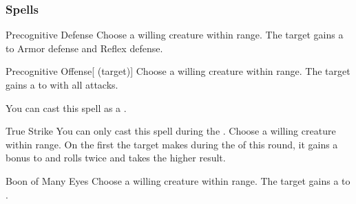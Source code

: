\subsubsection{Spells}


\lowercase{\hypertarget{spell:Precognitive Defense}{}}\label{spell:Precognitive Defense}
\begin{ability}[\nth{1}]{\hypertarget{spell:Precognitive Defense}{Precognitive Defense}}
Choose a willing creature within \rngclose range.
The target gains a   to Armor defense and Reflex defense.
\end{ability}
\vspace{0.25em}



\lowercase{\hypertarget{spell:Precognitive Offense}{}}\label{spell:Precognitive Offense}
\begin{ability}[\nth{1}]{\hypertarget{spell:Precognitive Offense}{Precognitive Offense}}[ (target)]
Choose a willing creature within \rngclose range.
The target gains a   to  with all attacks.

You can cast this spell as a .
\end{ability}
\vspace{0.25em}



\lowercase{\hypertarget{spell:True Strike}{}}\label{spell:True Strike}
\begin{ability}[\nth{1}]{\hypertarget{spell:True Strike}{True Strike}}
You can only cast this spell during the .
Choose a willing creature within \rngclose range.
On the first  the target makes during the  of this round, it gains a  bonus to  and rolls twice and takes the higher result.
\end{ability}
\vspace{0.25em}



\lowercase{\hypertarget{spell:Boon of Many Eyes}{}}\label{spell:Boon of Many Eyes}
\begin{ability}[\nth{2}]{\hypertarget{spell:Boon of Many Eyes}{Boon of Many Eyes}}
Choose a willing creature within \rngclose range.
The target gains a   to .
\end{ability}
\vspace{0.25em}



